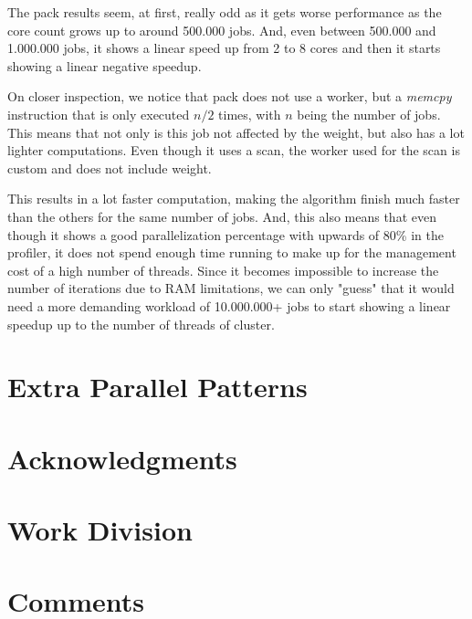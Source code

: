 \documentclass[9pt,journal]{IEEEtran}
\begin{document}
The pack results seem, at first, really odd as it gets worse performance as the core count grows up to around 500.000 jobs. And, even between 500.000 and 1.000.000 jobs, it shows a linear speed up from 2 to 8 cores and then it starts showing a linear negative speedup.

On closer inspection, we notice that pack does not use a worker, but a \textit{memcpy} instruction that is only executed $ n / 2 $ times, with $ n $ being the number of jobs. This means that not only is this job not affected by the weight, but also has a lot lighter computations. Even though it uses a scan, the worker used for the scan is custom and does not include weight.

This results in a lot faster computation, making the algorithm finish much faster than the others for the same number of jobs. And, this also means that even though it shows a good parallelization percentage with upwards of 80\% in the profiler, it does not spend enough time running to make up for the management cost of a high number of threads. Since it becomes impossible to increase the number of iterations due to RAM limitations, we can only "guess" that it would need a more demanding workload of 10.000.000+ jobs to start showing a linear speedup up to the number of threads of cluster.

\section{Extra Parallel Patterns}

\section{Acknowledgments}


{}

\section{Work Division}

\section{Comments}
\end{document}
